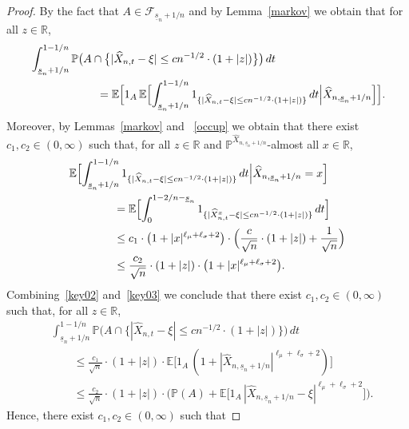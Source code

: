 \documentclass[11pt]{amsart}
\newcommand{\R}{{\mathbb R}}
\newcommand{\EE}{{\mathbb E}}
\newcommand{\PP}{{\mathbb P}}
\newcommand{\eul}{{\widehat X}}
\newcommand{\ind}{1}
\newcommand{\usn}{\underline {s}_n}
\newcommand{\F}{{\mathcal F}}
\theoremstyle{plain}
\theoremstyle{definition}
\begin{document}
\begin{proof}
 By the fact that $A\in \F_{\usn+1/n}$ and by
Lemma~\ref{markov} we obtain that for all $z\in\R$,
\begin{equation}\label{key02}
\begin{aligned}
& \int_{\usn+1/n}^{1-1/n} \PP\bigl(A \cap \bigl\{|\widehat X_{n,t}-\xi| \le c n^{-1/2}\cdot (1+|z|)\bigr\}\bigr)\, dt \\
& \qquad\qquad \qquad = \EE\Bigl[\ind_{A}\, \EE\Bigl[\int_{\usn+1/n}^{1-1/n} \ind_{\{|\widehat X_{n,t}-\xi| \le c n^{-1/2}\cdot (1+|z|)\}}\, dt\Bigl|\eul_{n,\usn+1/n}\Bigr]\Bigr].
\end{aligned}
\end{equation}
Moreover,
by  Lemmas~\ref{markov} and ~\ref{occup}
 we obtain that there exist $c_1, c_2\in(0, \infty)$ such that,  for all $z\in\R$
and $\PP ^{\eul_{n,\usn+1/n}} $-almost all
$x\in\R$,
\begin{equation}\label{key03}
\begin{aligned}
& \EE\Bigl[\int_{\usn+1/n}^{1-1/n} \ind_{\{|\widehat X_{n,t}-\xi| \le c n^{-1/2}\cdot (1+|z|)\}}\, dt\Bigl|\eul_{n,\usn+1/n}=x\Bigr]\\
 & \qquad\qquad = \EE\Bigl[\int_{0}^{1-2/n-\usn} \ind_{\{|\widehat X^x_{n,t}-\xi| \le c n^{-1/2}\cdot (1+|z|)\}}\, dt\Bigr]\\
 & \qquad\qquad \le c_1\cdot \bigl(1+|x|^{\ell_\mu + \ell_\sigma+2}\bigr)
 \cdot \Bigl( \frac{c}{\sqrt{n}} \cdot(1+|z|) + \frac{1}{\sqrt{n}}\Bigr)\\
 &\qquad\qquad\leq  \frac{c_2}{\sqrt n}\cdot (1+|z|)\cdot \bigl(1+|x|^{\ell_\mu + \ell_\sigma+2}\bigr).
\end{aligned}
\end{equation}
Combining~\eqref{key02} and~\eqref{key03}
we conclude that there exist $c_1, c_2\in(0, \infty)$ such that, for  all $z\in\R$,
\begin{equation}\label{key04}
\begin{aligned}
& \int_{\usn+1/n}^{1-1/n} \PP\bigl(A \cap \bigl\{|\widehat X_{n,t}-\xi| \le c n^{-1/2}\cdot (1+|z|)\bigr\}\bigr)\, dt \\
& \qquad  \le \frac{c_1}{\sqrt n}\cdot (1+|z|)\cdot \EE\bigl[\ind_{A}\, (1 + |\eul_{n,\usn+1/n}|^{\ell_\mu + \ell_\sigma+2})\bigr]\\
 & \qquad \le \frac{c_2}{\sqrt n} \cdot (1+|z|)\cdot \bigl(\PP(A) + \EE\bigl[\ind_{A}\, |\eul_{n,\usn+1/n}-\xi|^{\ell_\mu + \ell_\sigma+2}\bigr]\bigr).
\end{aligned}
\end{equation}
Hence, there exist $c_1, c_2\in(0, \infty)$ such that

\end{proof}
\end{document}
